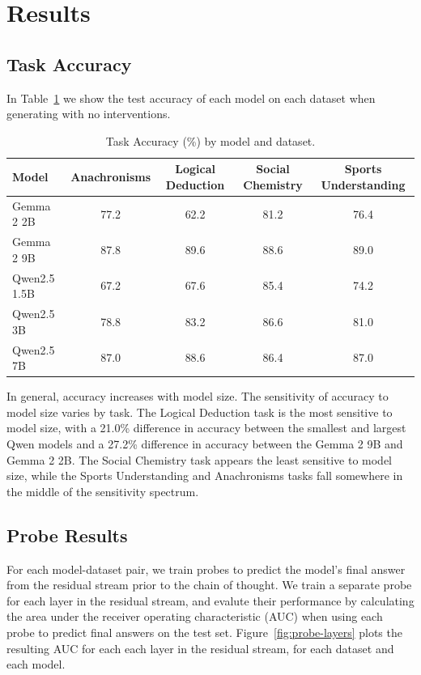 \documentclass{article}
\begin{document}
\section{Results}

\subsection{Task Accuracy}

In Table~\ref{tab:test-acc} we show the test accuracy of each model on each dataset when generating with no interventions.

\begin{table}[t]
\centering
\caption{Task Accuracy (\%) by model and dataset.}
\label{tab:test-acc}
\begin{tabular}{lcccc}
\toprule
\textbf{Model} & \textbf{Anachronisms} & \textbf{Logical Deduction} & \textbf{Social Chemistry} & \textbf{Sports Understanding} \\
\midrule
Gemma 2 2B            & 77.2 & 62.2 & 81.2 & 76.4 \\
Gemma 2 9B            & 87.8 & 89.6 & 88.6 & 89.0 \\
Qwen2.5 1.5B    & 67.2 & 67.6 & 85.4 & 74.2 \\
Qwen2.5 3B      & 78.8 & 83.2 & 86.6 & 81.0 \\
Qwen2.5 7B      & 87.0 & 88.6 & 86.4 & 87.0 \\
\bottomrule
\end{tabular}
\end{table}

In general, accuracy increases with model size. The sensitivity of accuracy to model size varies by task. The Logical Deduction task is the most sensitive to model size, with a 21.0\% difference in accuracy between the smallest and largest Qwen models and a 27.2\% difference in accuracy between the Gemma 2 9B and Gemma 2 2B. The Social Chemistry task appears the least sensitive to model size, while the Sports Understanding and Anachronisms tasks fall somewhere in the middle of the sensitivity spectrum.

\subsection{Probe Results}

For each model-dataset pair, we train probes to predict the model's final answer from the residual stream prior to the chain of thought. We train a separate probe for each layer in the residual stream, and evalute their performance by calculating the area under the receiver operating characteristic (AUC) when using each probe to predict final answers on the test set. Figure~\ref{fig:probe-layers} plots the resulting AUC for each each layer in the residual stream, for each dataset and each model.
\end{document}
